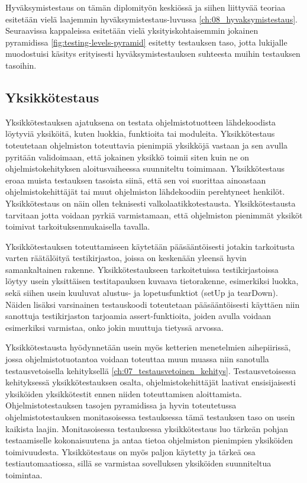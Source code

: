   Hyväksymistestaus on tämän diplomityön keskiössä ja siihen liittyvää teoriaa esitetään vielä laajemmin hyväksymistestaus-luvussa \ref{ch:08_hyvaksymistestaus}.
  Seuraavissa kappaleissa esitetään vielä yksityiskohtaisemmin jokainen pyramidissa \ref{fig:testing-levels-pyramid} esitetty testauksen taso, jotta lukijalle muodostuisi käsitys erityisesti hyväksymistestauksen suhteesta muihin testauksen tasoihin.

  \subsection{Yksikkötestaus} \label{ch:07_yksikkotestaus}

    Yksikkötestauksen ajatuksena on testata ohjelmistotuotteen lähdekoodista löytyviä yksiköitä, kuten luokkia, funktioita tai moduleita.
    Yksikkötestaus toteutetaan ohjelmiston toteuttavia pienimpiä yksikköjä vastaan ja sen avulla pyritään validoimaan, että jokainen yksikkö toimii siten kuin ne on ohjelmistokehityksen aloitusvaiheessa suunniteltu toimimaan.
    Yksikkötestaus eroaa muista testauksen tasoista siinä, että sen voi suorittaa ainoastaan ohjelmistokehittäjät tai muut ohjelmiston lähdekoodiin perehtyneet henkilöt.
    Yksikkötestaus on näin ollen teknisesti valkolaatikkotestausta.
    Yksikkötestausta tarvitaan jotta voidaan pyrkiä varmistamaan, että ohjelmiston pienimmät yksiköt toimivat tarkoituksenmukaisella tavalla.

    Yksikkötestauksen toteuttamiseen käytetään pääsääntöisesti jotakin tarkoitusta varten räätälöityä testikirjastoa, joissa on keskenään yleensä hyvin samankaltainen rakenne.
    Yksikkötestaukseen tarkoitetuissa testikirjastoissa löytyy usein yksittäisen testitapauksen kuvaava tietorakenne, esimerkiksi luokka, sekä siihen usein kuuluvat alustus- ja lopetusfunktiot (setUp ja tearDown).
    Näiden lisäksi varsinainen testauskoodi toteutetaan pääsääntöisesti käyttäen niin sanottuja testikirjaston tarjoamia assert-funktioita, joiden avulla voidaan esimerkiksi varmistaa, onko jokin muuttuja tietyssä arvossa.

    Yksikkötestausta hyödynnetään usein myös ketterien menetelmien aihepiirissä, jossa ohjelmistotuotantoa voidaan toteuttaa muun muassa niin sanotulla testausvetoisella kehityksellä \ref{ch:07_testausvetoinen_kehitys}.
    Testausvetoisessa kehityksessä yksikkötestauksen osalta, ohjelmistokehittäjät laativat ensisijaisesti yksiköiden yksikkötestit ennen niiden toteuttamisen aloittamista.
    Ohjelmistotestauksen tasojen pyramidissa ja hyvin toteutetussa ohjelmistotestauksen monitasoisessa testauksessa tämä testauksen taso on usein kaikista laajin.
    Monitasoisessa testauksessa yksikkötestaus luo tärkeän pohjan testaamiselle kokonaisuutena ja antaa tietoa ohjelmiston pienimpien yksiköiden toimivuudesta.
    Yksikkötestaus on myös paljon käytetty ja tärkeä osa testiautomaatiossa, sillä se varmistaa sovelluksen yksiköiden suunniteltua toimintaa.

